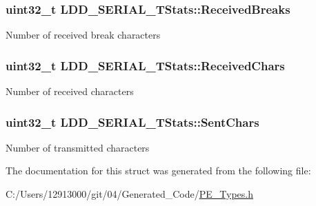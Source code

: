 \subsubsection[{Received\+Breaks}]{\setlength{\rightskip}{0pt plus 5cm}uint32\+\_\+t L\+D\+D\+\_\+\+S\+E\+R\+I\+A\+L\+\_\+\+T\+Stats\+::\+Received\+Breaks}\label{struct_l_d_d___s_e_r_i_a_l___t_stats_a45f707461666b974a6c3b5c948e66cf7}
Number of received break characters \hypertarget{struct_l_d_d___s_e_r_i_a_l___t_stats_a7dd5faa8bc6c15fde011eb6192ca6168}{}
\subsubsection[{Received\+Chars}]{\setlength{\rightskip}{0pt plus 5cm}uint32\+\_\+t L\+D\+D\+\_\+\+S\+E\+R\+I\+A\+L\+\_\+\+T\+Stats\+::\+Received\+Chars}\label{struct_l_d_d___s_e_r_i_a_l___t_stats_a7dd5faa8bc6c15fde011eb6192ca6168}
Number of received characters \hypertarget{struct_l_d_d___s_e_r_i_a_l___t_stats_a60198f844b85f9e73efaca83e32471cd}{}
\subsubsection[{Sent\+Chars}]{\setlength{\rightskip}{0pt plus 5cm}uint32\+\_\+t L\+D\+D\+\_\+\+S\+E\+R\+I\+A\+L\+\_\+\+T\+Stats\+::\+Sent\+Chars}\label{struct_l_d_d___s_e_r_i_a_l___t_stats_a60198f844b85f9e73efaca83e32471cd}
Number of transmitted characters 

The documentation for this struct was generated from the following file\+:\begin{DoxyCompactItemize}
\item 
C\+:/\+Users/12913000/git/04/\+Generated\+\_\+\+Code/\hyperlink{_p_e___types_8h}{P\+E\+\_\+\+Types.\+h}\end{DoxyCompactItemize}
